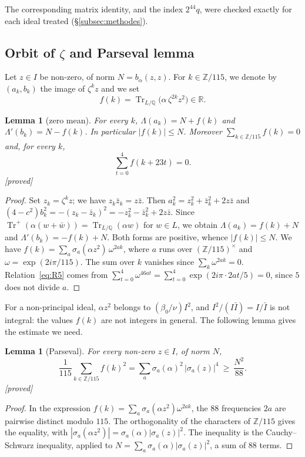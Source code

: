 \documentclass[11pt,a4paper]{amsart}
\theoremstyle{plain}
\newtheorem{lemma}[theorem]{Lemma}
\theoremstyle{definition}
\numberwithin{equation}{section}
\newcommand{\Q}{\mathbb{Q}}
\newcommand{\Z}{\mathbb{Z}}
\newcommand{\R}{\mathbb{R}}
\DeclareMathOperator{\Tr}{Tr}
\newcommand{\Trp}{\Tr^{+}}
\newcommand{\st}[1]{\textup{\textsf{\small[#1]}}}
\newcommand{\DEM}{\st{proved}}
\begin{document}
The corresponding matrix identity, and the index $2^{44}q$, were checked exactly for each ideal treated (\S\ref{subsec:methodes}).

\subsection{Orbit of \texorpdfstring{$\zeta$}{zeta} and Parseval lemma}
Let $z\in I$ be non-zero, of norm $N=b_\alpha(z,z)$. For $k\in\Z/115$, we denote by $(a_k,b_k)$ the image of $\zeta^kz$ and we set
\[
f(k)=\Tr_{L/\Q}\bigl(\alpha\,\zeta^{2k}z^2\bigr)\in\R .
\]

\begin{lemma}[zero mean]\label{lem:A}
For every $k$, $\Lambda(a_k)=N+f(k)$ and $\Lambda'(b_k)=N-f(k)$. In particular $|f(k)|\le N$. Moreover $\sum_{k\in\Z/115}f(k)=0$ and, for every $k$,
\begin{equation}\label{eq:R5}
\sum_{t=0}^{4}f(k+23t)=0 .
\end{equation}
\DEM
\end{lemma}

\begin{proof}
Set $z_k=\zeta^kz$; we have $z_k\bar z_k=z\bar z$. Then $a_k^2=z_k^2+\bar z_k^2+2z\bar z$ and $(4-c^2)b_k^2=-(z_k-\bar z_k)^2=-z_k^2-\bar z_k^2+2z\bar z$. Since $\Trp(\alpha(w+\bar w))=\Tr_{L/\Q}(\alpha w)$ for $w\in L$, we obtain $\Lambda(a_k)=f(k)+N$ and $\Lambda'(b_k)=-f(k)+N$. Both forms are positive, whence $|f(k)|\le N$. We have $f(k)=\sum_a\sigma_a(\alpha z^2)\,\omega^{2ak}$, where $a$ runs over $(\Z/115)^\times$ and $\omega=\exp(2i\pi/115)$. The sum over $k$ vanishes since $\sum_k\omega^{2ak}=0$. Relation~\eqref{eq:R5} comes from $\sum_{t=0}^{4}\omega^{46at}=\sum_{t=0}^{4}\exp(2i\pi\cdot2at/5)=0$, since $5$ does not divide $a$.
\end{proof}

For a non-principal ideal, $\alpha z^2$ belongs to $(\beta_0/\nu)I^2$, and $I^2/(I\bar I)=I/\bar I$ is not integral: the values $f(k)$ are not integers in general. The following lemma gives the estimate we need.

\begin{lemma}[Parseval]\label{lem:parseval}
For every non-zero $z\in I$, of norm $N$,
\[
\frac1{115}\sum_{k\in\Z/115}f(k)^2=\sum_{a}\sigma_a(\alpha)^2\,|\sigma_a(z)|^4\ \ge\ \frac{N^2}{88}.
\]
\DEM
\end{lemma}

\begin{proof}
In the expression $f(k)=\sum_a\sigma_a(\alpha z^2)\omega^{2ak}$, the $88$ frequencies $2a$ are pairwise distinct modulo $115$. The orthogonality of the characters of $\Z/115$ gives the equality, with $|\sigma_a(\alpha z^2)|=\sigma_a(\alpha)|\sigma_a(z)|^2$. The inequality is the Cauchy--Schwarz inequality, applied to $N=\sum_a\sigma_a(\alpha)|\sigma_a(z)|^2$, a sum of $88$ terms.
\end{proof}
\end{document}
